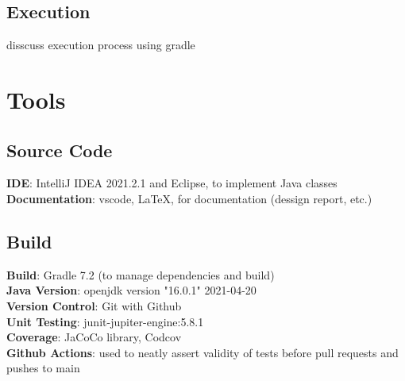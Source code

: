 \documentclass[12pt, dvipsnames, a4paper]{article}
\begin{document}
\subsection{Execution}
disscuss execution process using gradle
\section{Tools}
\subsection{Source Code}
\textbf{IDE}: IntelliJ IDEA 2021.2.1 and Eclipse, to implement Java classes\\
\textbf{Documentation}: vscode, \LaTeX, for documentation (dessign report, etc.)
\subsection{Build}
\textbf{Build}: Gradle 7.2 (to manage dependencies and build)\\
\textbf{Java Version}: openjdk version "16.0.1" 2021-04-20\\
\textbf{Version Control}: Git with Github \\
\textbf{Unit Testing}: junit-jupiter-engine:5.8.1\\
\textbf{Coverage}: JaCoCo library, Codcov\\
\textbf{Github Actions}: used to neatly assert validity of tests before pull requests and pushes to main
\clearpage
\end{document}
